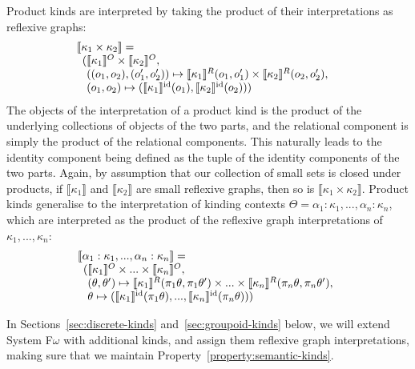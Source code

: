 \documentclass[preprint]{sigplanconf}
\theoremstyle{examplestyle}
\newcommand{\sem}[1]{\llbracket #1 \rrbracket}
\newcommand{\semKU}[1]{\llbracket #1 \rrbracket^O}
\newcommand{\semKR}[1]{\llbracket #1 \rrbracket^R}
\newcommand{\semKI}[1]{\llbracket #1 \rrbracket^{\mathrm{id}}}
\begin{document}
Product kinds are interpreted by taking the product of their
interpretations as reflexive graphs:
\begin{displaymath}
  \begin{array}{@{}l}
    \sem{\kappa_1 \times \kappa_2} = \\
    \begin{array}[t]{l@{}l}
      (& \semKU{\kappa_1} \times \semKU{\kappa_2}, \\
      & ((o_1,o_2),(o_1',o_2')) \mapsto \semKR{\kappa_1}(o_1,o_1') \times \semKR{\kappa_2}(o_2,o_2'), \\
      & (o_1,o_2) \mapsto (\semKI{\kappa_1}(o_1), \semKI{\kappa_2}(o_2)))
    \end{array}
  \end{array}
\end{displaymath}
The objects of the interpretation of a product kind is the product of
the underlying collections of objects of the two parts, and the
relational component is simply the product of the relational
components. This naturally leads to the identity component being
defined as the tuple of the identity components of the two
parts. Again, by assumption that our collection of small sets is
closed under products, if $\sem{\kappa_1}$ and $\sem{\kappa_2}$ are
small reflexive graphs, then so is $\sem{\kappa_1 \times
  \kappa_2}$. Product kinds generalise to the interpretation of
kinding contexts $\Theta = \alpha_1 : \kappa_1, ..., \alpha_n :
\kappa_n$, which are interpreted as the product of the reflexive graph
interpretations of $\kappa_1, ..., \kappa_n$:
\begin{displaymath}
  \begin{array}{l}
    \sem{\alpha_1 : \kappa_1, ..., \alpha_n : \kappa_n} = \\
    \begin{array}[t]{l@{}l}
      (&\semKU{\kappa_1} \times ... \times \semKU{\kappa_n}, \\
      &(\theta,\theta') \mapsto \semKR{\kappa_1}(\pi_1\theta, \pi_1\theta') \times ... \times \semKR{\kappa_n}(\pi_n\theta, \pi_n\theta'), \\
      &\theta \mapsto (\semKI{\kappa_1}(\pi_1 \theta), ..., \semKI{\kappa_n}(\pi_n \theta)))
    \end{array}
  \end{array}
\end{displaymath}

In Sections~\ref{sec:discrete-kinds} and~\ref{sec:groupoid-kinds}
below, we will extend System F$\omega$ with additional kinds, and
assign them reflexive graph interpretations, making sure that we
maintain Property~\ref{property:semantic-kinds}.
\end{document}
